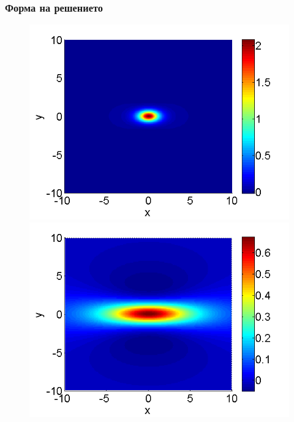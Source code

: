 \documentclass{beamer}
\begin{document}
\begin{frame}
\frametitle{Форма на решението}
\begin{figure}[ht]
	\begin{minipage}[b]{0.45\linewidth}
		\raggedleft
		\includegraphics[width=\linewidth]{../Thesis/SolutionView/ChristovIC_30_bt3_c045_topview.png}
	\end{minipage}
	\begin{minipage}[b]{0.45\linewidth}
		\raggedright
		\includegraphics[width=\linewidth]{../Thesis/SolutionView/ChristovIC_128_bt1_c090_topview.png}
	\end{minipage}
	\begin{minipage}[b]{0.45\linewidth}

\end{minipage}
\end{figure}
\end{frame}
\end{document}
